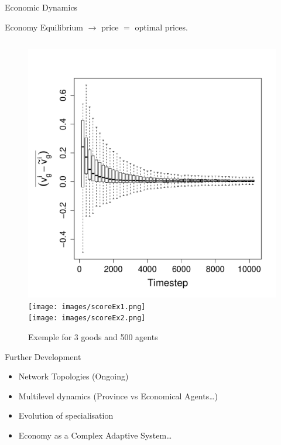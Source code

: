 \documentclass[12pt, handout=show,notes=show]{beamer}
\begin{document}
\begin{frame}{Economic Dynamics}
	\begin{block}{Economy}
		Equilibrium $\rightarrow$ price $=$ optimal prices.
	\end{block}
	\begin{figure}
	    \caption{Exemple for 3 goods and 500 agents}
	    \begin{columns}
		\includegraphics[height=\textwidth]{images/ClearingPriceDistanceEvolutionForTrade-G3N500.pdf}
		\texttt{[image: images/scoreEx1.png]}\\
		\texttt{[image: images/scoreEx2.png]}
	    \end{columns}
	\end{figure}
	
\end{frame}

\begin{frame}{Further Development}
	\begin{itemize}
		\item Network Topologies (Ongoing)
			\vfil
		\item	Multilevel dynamics (Province vs Economical Agents\ldots)
			\vfil
		\item	Evolution of specialisation 
			\vfil
		\item	Economy as a Complex Adaptive System\ldots
	\end{itemize}
\end{frame}
\end{document}
